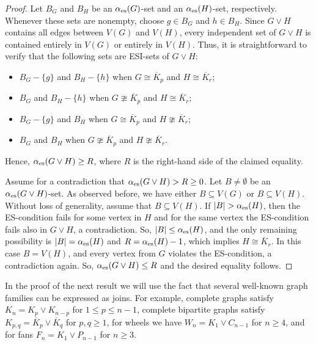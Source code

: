 \documentclass[11pt]{article}
\newcommand{\es}{\alpha_{\rm es}}
\begin{document}
\begin{proof}
Let $B_G$ and $B_H$ be an $\es(G)$-set and an $\es(H)$-set, respectively. Whenever these
sets are nonempty, choose  $g\in B_G$ and $h\in B_H$. Since $G\vee H$ contains all edges between $V(G)$ and $V(H)$, every independent
set of $G\vee H$ is contained entirely in $V(G)$ or entirely in $V(H)$. Thus, it is straightforward to verify that the following sets are ESI-sets of $G\vee H$:
\begin{itemize}
\item $B_G-\{g\}$ and $B_H-\{h\}$ when $G\cong \overline{K}_p$ and $H\cong \overline{K}_r$;
\item $B_G$ and $B_H-\{h\}$ when $G\ncong \overline{K}_p$ and $H\cong \overline{K}_r$;
\item $B_G-\{g\}$ and $B_H$ when $G\cong \overline{K}_p$ and $H\ncong \overline{K}_r$;
\item $B_G$ and $B_H$ when $G\ncong \overline{K}_p$ and $H\ncong \overline{K}_r$.
\end{itemize}
Hence, $\es(G\vee H)\geq R$, where $R$ is the right-hand side of the claimed equality.

Assume for a contradiction that $\es(G\vee H)>R\geq 0$. Let $B\neq\emptyset$ be an $\es(G\vee H)$-set. As observed before, we have either $B\subseteq V(G)$ or $B\subseteq V(H)$. Without loss of generality, assume that
$B\subseteq V(H)$. If $|B|>\es(H)$, then the ES-condition fails for some vertex in $H$ and for the same vertex the ES-condition fails also in $G\vee H$, a contradiction. So, $|B|\leq \es(H)$, and the only remaining possibility is $|B|=\es(H)$ and $R=\es(H)-1$, which implies $H\cong \overline{K}_r$. In this case $B=V(H)$, and every vertex from $G$ violates the ES-condition, a contradiction again. So, $\es(G\vee H)\leq R$ and the desired equality follows.
\end{proof}

In the proof of the next result we will use the fact that several well-known graph families can be expressed as joins. For example, complete graphs satisfy $K_n=K_p\vee K_{n-p}$ for $1\leq p\leq n-1$, complete bipartite graphs  satisfy $K_{p,q}=\overline{K}_p\vee \overline{K}_q$ for $p,q\geq 1$, for wheels we have $W_n=K_1\vee C_{n-1}$ for $n\geq 4$, and for fans $F_n=K_1\vee P_{n-1}$ for $n\geq 3$.
\end{document}
